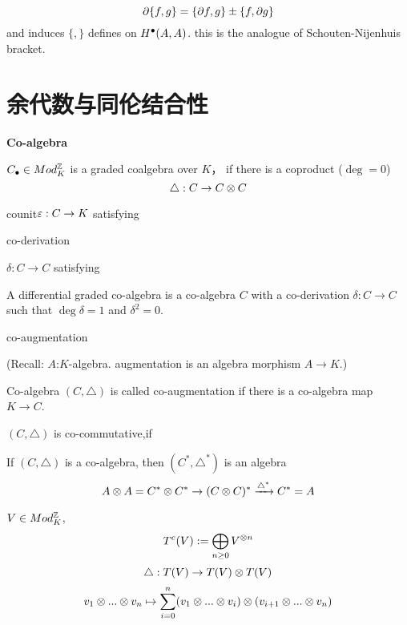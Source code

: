 \begin{prop}
$$\partial\{f,g\}=\{\partial f,g\}\pm\{f,\partial g\}$$
and induces
$\{,\}$ defines on $H^{\bullet}(A,A)$.
this is  the analogue of Schouten-Nijenhuis bracket.
\end{prop}



\section{余代数与同伦结合性}

\textbf{Co-algebra}

\begin{definition}
$C_{\bullet}\in Mod_K^{\mathbb{Z}}$ is a graded coalgebra over $K$，
if there is a coproduct ($\deg=0$)
$$\triangle:C\to C\otimes C$$
\end{definition}

counit$\varepsilon:C\to K$ satisfying

co-derivation

$\delta: C\to C$ satisfying

A differential graded co-algebra is a co-algebra
$C$ with a co-derivation $\delta:C\to C$ such that
$\deg\delta=1$ and $\delta^2=0$.

co-augmentation

 (Recall:
 $A$:$K$-algebra. augmentation is an algebra morphism
$A\to K$.)

Co-algebra $(C,\triangle)$ is called co-augmentation if
there is a co-algebra map $K\to C$.

$(C,\triangle)$ is co-commutative,if

\begin{rem}
If $(C,\triangle)$ is a co-algebra, then
$(C^*,\triangle^*)$ is an algebra
$$A\otimes A=C^*\otimes C^*\to(C\otimes C)^*\xrightarrow{\triangle^*}C^*=A$$
\end{rem}

\begin{example}
$V\in Mod_K^{\mathbb{Z}}$,
$$T^c(V):=\bigoplus_{n\geq 0}V^{\otimes n}$$
$$\triangle:T(V)\to T(V)\otimes T(V)$$
$$v_1\otimes...\otimes v_n\mapsto
\sum_{i=0}^n(v_1\otimes...\otimes v_i)\otimes(v_{i+1}\otimes...\otimes v_n)$$
\end{example}

